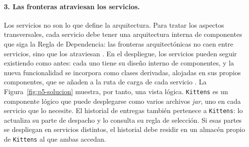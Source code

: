 \paragraph{3. Las fronteras atraviesan los servicios.}
Los servicios no son lo que define la arquitectura. Para tratar los aspectos
transversales, cada servicio debe tener una arquitectura interna de componentes que siga
la Regla de Dependencia: las fronteras arquitectónicas no caen entre servicios, sino que
los atraviesan \parencite[246--247]{martin2017}. En el despliegue, los servicios pueden
seguir existiendo como antes: cada uno tiene su diseño interno de componentes, y la nueva
funcionalidad se incorpora como clases derivadas, alojadas en sus propios componentes,
que se añaden a la ruta de carga de cada servicio \parencite[246]{martin2017}. La
Figura~\ref{fig:p5-solucion} muestra, por tanto, una vista lógica. \texttt{Kittens} es un
componente lógico que puede desplegarse como varios archivos \emph{jar}, uno en cada
servicio que lo necesite. El historial de entregas también pertenece a \texttt{Kittens}:
lo actualiza su parte de despacho y lo consulta su regla de selección. Si esas partes se
despliegan en servicios distintos, el historial debe residir en un almacén propio de
\texttt{Kittens} al que ambas accedan.


